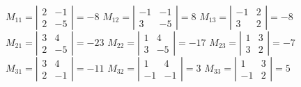 \documentclass[stu, 12pt, letterpaper, donotrepeattitle, floatsintext, natbib]{apa7}
\begin{document}
$M_{11}=\left| \begin{matrix}
2 & -1 \\ 2 & -5 \end{matrix} \right| = -8$
\qquad
$M_{12}=\left| \begin{matrix}
-1 & -1 \\ 3 & -5 \end{matrix} \right| = 8$
\qquad
$M_{13}=\left| \begin{matrix}
-1 & 2 \\ 3 & 2 \end{matrix} \right| = -8$ \\[0.4cm]


$M_{21}=\left| \begin{matrix}
3 & 4 \\ 2 & -5 \end{matrix} \right| = -23$
\qquad
$M_{22}=\left| \begin{matrix}
1 & 4 \\ 3 & -5 \end{matrix} \right| = -17$
\qquad
$M_{23}=\left| \begin{matrix}
1 & 3 \\ 3 & 2 \end{matrix} \right| = -7$\\[0.4cm]


$M_{31}=\left| \begin{matrix}
3 & 4 \\ 2 & -1 \end{matrix} \right| = -11$
\qquad
$M_{32}=\left| \begin{matrix}
1 & 4 \\ -1 & -1 \end{matrix} \right| = 3$
\qquad
$M_{33}=\left| \begin{matrix}
1 & 3 \\ -1 & 2 \end{matrix} \right| = 5$ \\

\newpage
\end{document}
